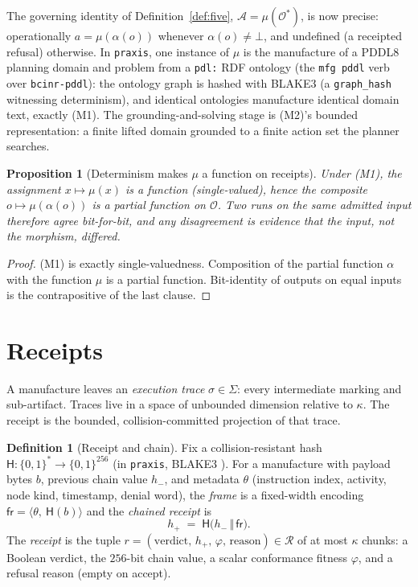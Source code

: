 \documentclass[11pt,oneside]{book}
\theoremstyle{definition}
\newtheorem{definition}{Definition}[chapter]
\theoremstyle{plain}
\newtheorem{proposition}[theorem]{Proposition}
\theoremstyle{remark}
\newcommand{\Obs}{\mathcal{O}}                 %
\newcommand{\Adm}{\mathcal{O}^{*}}             %
\newcommand{\Act}{\mathcal{A}}                 %
\newcommand{\Rec}{\mathcal{R}}                 %
\newcommand{\muop}{\mu}                        %
\newcommand{\adm}{\alpha}                      %
\newcommand{\chainH}{\mathsf{H}}               %
\newcommand{\Rfsl}{\bot}                        %
\newcommand{\CL}{\kappa}                       %
\newcommand{\Fitness}{\varphi}
\newcommand{\code}[1]{\texttt{#1}}
\begin{document}
The governing identity of Definition~\ref{def:five},
$\Act=\muop(\Adm)$, is now precise: operationally
$a=\muop(\adm(o))$ whenever $\adm(o)\neq\Rfsl$, and undefined (a receipted refusal)
otherwise. In \code{praxis}, one instance of $\muop$ is the manufacture of a PDDL8 planning
domain and problem from a \code{pdl:} RDF ontology (the \code{mfg pddl} verb over
\code{bcinr-pddl}): the ontology graph is hashed with BLAKE3 (a \code{graph\_hash} witnessing
determinism), and identical ontologies manufacture identical domain text, exactly (M1). The
grounding-and-solving stage is (M2)'s bounded representation: a finite lifted domain grounded
to a finite action set the planner searches.

\begin{proposition}[Determinism makes $\muop$ a function on receipts]\label{prop:mudet}
Under (M1), the assignment $x\mapsto\muop(x)$ is a function (single-valued), hence the
composite $o\mapsto\muop(\adm(o))$ is a partial function on $\Obs$. Two runs on the same
admitted input therefore agree bit-for-bit, and any disagreement is evidence that the input,
not the morphism, differed.
\end{proposition}

\begin{proof}
(M1) is exactly single-valuedness. Composition of the partial function $\adm$ with the
function $\muop$ is a partial function. Bit-identity of outputs on equal inputs is the
contrapositive of the last clause. \end{proof}

\section{Receipts}

A manufacture leaves an \emph{execution trace} $\sigma\in\Sigma$: every intermediate marking
and sub-artifact. Traces live in a space of unbounded dimension relative to $\CL$. The
receipt is the bounded, collision-committed projection of that trace.

\begin{definition}[Receipt and chain]\label{def:receipt}
Fix a collision-resistant hash $\chainH:\{0,1\}^{*}\to\{0,1\}^{256}$ (in \code{praxis},
BLAKE3 \cite{blake3}). For a manufacture with payload bytes $b$, previous chain value
$h_{-}$, and metadata $\theta$ (instruction index, activity, node kind, timestamp, denial
word), the \emph{frame} is a fixed-width encoding
$\mathsf{fr}=\langle\theta,\ \chainH(b)\rangle$ and the \emph{chained receipt} is
\begin{equation}\label{eq:chain}
h_{+}\;=\;\chainH\bigl(h_{-}\,\Vert\,\mathsf{fr}\bigr).
\end{equation}
The \emph{receipt} is the tuple
$r=(\text{verdict},\,h_{+},\,\Fitness,\,\text{reason})\in\Rec$ of at most $\CL$ chunks: a
Boolean verdict, the $256$-bit chain value, a scalar conformance fitness $\Fitness$, and a
refusal reason (empty on accept).
\end{definition}
\end{document}
